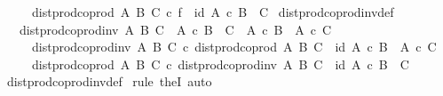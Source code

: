\begin{isabellebody}
\ \ \ \ {\isasymand}\ dist{\isacharunderscore}{\kern0pt}prod{\isacharunderscore}{\kern0pt}coprod\ A\ B\ C\ {\isasymcirc}\isactrlsub c\ f\ {\isacharequal}{\kern0pt}\ id\ {\isacharparenleft}{\kern0pt}A\ {\isasymtimes}\isactrlsub c\ {\isacharparenleft}{\kern0pt}B\ {\isasymCoprod}\ C{\isacharparenright}{\kern0pt}{\isacharparenright}{\kern0pt}{\isacharparenright}{\kern0pt}{\isachardoublequoteclose}\isanewline
\isanewline
{}\isamarkupfalse%
\ dist{\isacharunderscore}{\kern0pt}prod{\isacharunderscore}{\kern0pt}coprod{\isacharunderscore}{\kern0pt}inv{\isacharunderscore}{\kern0pt}def{}{\isacharcolon}{\kern0pt}\isanewline
\ \ \ {\isachardoublequoteopen}dist{\isacharunderscore}{\kern0pt}prod{\isacharunderscore}{\kern0pt}coprod{\isacharunderscore}{\kern0pt}inv\ A\ B\ C\ {\isacharcolon}{\kern0pt}\ A\ {\isasymtimes}\isactrlsub c\ {\isacharparenleft}{\kern0pt}B\ {\isasymCoprod}\ C{\isacharparenright}{\kern0pt}\ {\isasymrightarrow}\ {\isacharparenleft}{\kern0pt}A\ {\isasymtimes}\isactrlsub c\ B{\isacharparenright}{\kern0pt}\ {\isasymCoprod}\ {\isacharparenleft}{\kern0pt}A\ {\isasymtimes}\isactrlsub c\ C{\isacharparenright}{\kern0pt}\isanewline
\ \ \ \ {\isasymand}\ dist{\isacharunderscore}{\kern0pt}prod{\isacharunderscore}{\kern0pt}coprod{\isacharunderscore}{\kern0pt}inv\ A\ B\ C\ {\isasymcirc}\isactrlsub c\ dist{\isacharunderscore}{\kern0pt}prod{\isacharunderscore}{\kern0pt}coprod\ A\ B\ C\ {\isacharequal}{\kern0pt}\ id\ {\isacharparenleft}{\kern0pt}{\isacharparenleft}{\kern0pt}A\ {\isasymtimes}\isactrlsub c\ B{\isacharparenright}{\kern0pt}\ {\isasymCoprod}\ {\isacharparenleft}{\kern0pt}A\ {\isasymtimes}\isactrlsub c\ C{\isacharparenright}{\kern0pt}{\isacharparenright}{\kern0pt}\isanewline
\ \ \ \ {\isasymand}\ dist{\isacharunderscore}{\kern0pt}prod{\isacharunderscore}{\kern0pt}coprod\ A\ B\ C\ {\isasymcirc}\isactrlsub c\ dist{\isacharunderscore}{\kern0pt}prod{\isacharunderscore}{\kern0pt}coprod{\isacharunderscore}{\kern0pt}inv\ A\ B\ C\ {\isacharequal}{\kern0pt}\ id\ {\isacharparenleft}{\kern0pt}A\ {\isasymtimes}\isactrlsub c\ {\isacharparenleft}{\kern0pt}B\ {\isasymCoprod}\ C{\isacharparenright}{\kern0pt}{\isacharparenright}{\kern0pt}{\isachardoublequoteclose}\isanewline
%
\isadelimproof
\ \ %
\endisadelimproof
%
\isatagproof
{}\isamarkupfalse%
\ dist{\isacharunderscore}{\kern0pt}prod{\isacharunderscore}{\kern0pt}coprod{\isacharunderscore}{\kern0pt}inv{\isacharunderscore}{\kern0pt}def\isanewline
{}\isamarkupfalse%
\ {\isacharparenleft}{\kern0pt}rule\ theI{\isacharprime}{\kern0pt}{\isacharcomma}{\kern0pt}\ auto{\isacharparenright}{\kern0pt}\isanewline

\end{isabellebody}

